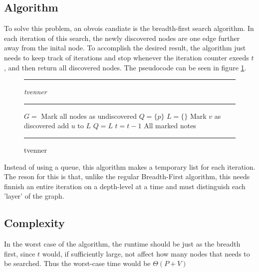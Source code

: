 \subsection{Algorithm}

To solve this problem, an obvois candiate is the
breadth-first search algorithm. In each iteration of this
search, the newly discovered nodes are one edge further 
away from the inital node. To accomplish the desired result, 
the algorithm just needs to keep track of iterations and
stop whenever the iteration counter exeeds $t$, and then
return all discovered nodes. The pseudocode can 
be seen in figure \ref{fig:tvennerpcode}.

\begin{figure}[ht]
\hrule
\vspace{0.2cm}
{\centering  \textit{tvenner}}
\vspace{0.2cm}
\hrule
\begin{algorithmic}
\State $G = $ 
\State Mark all nodes as undiscovered
\State $Q = \{p\}$
\State $L = \{\}$
	\State Mark $v$ as discovered
		\State add $u$ to $L$
	\EndFor
\EndFor
\State $Q = L$
\State $t = t-1$
\EndWhile
\State \Return All marked notes
\EndFunction
\end{algorithmic}
\hrule
\caption{tvenner  \label{fig:tvennerpcode}}
\end{figure}

Instead of using a queue, this algorithm makes a temporary list 
for each iteration. The reson for this is that, unlike the 
regular Breadth-First algorithm, this needs finnish an entire 
iteration on a depth-level at a time and must distinguish 
each 'layer' of the graph.

\subsection{Complexity}

In the worst case of the algorithm, the runtime should be just as
the breadth first, since $t$ would, if sufficiently large, not 
affect how many nodes that needs to be searched. Thus the
worst-case time would be $\Theta \left( P + V \right)$








